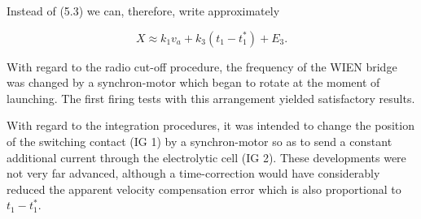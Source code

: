 \documentclass[12pt, a4paper]{article}
\begin{document}
Instead of (5.3) we can, therefore, write approximately

\begin{equation}
  X\approx k_{1}v_{a}+k_{3}(t_{1}-t_{1}^{*})+E_{3}.
\end{equation}

With regard to the radio cut-off procedure, the frequency of the WIEN bridge was changed by a synchron-motor which began to rotate at the moment of launching. The first firing tests with this arrangement yielded satisfactory results.

With regard to the integration procedures, it was intended to change the position of the switching contact (IG 1) by a synchron-motor so as to send a constant additional current through the electrolytic cell (IG 2). These developments were not very far advanced, although a time-correction would have considerably reduced the apparent velocity compensation error which is also proportional to $t_{1}-t_{1}^{*}$.
\end{document}
